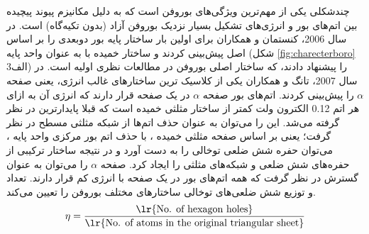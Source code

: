 چندشکلی یکی از مهم‌ترین ویژگی‌های بوروفن است که به دلیل مکانیزم پیوند پیچیده بین اتم‌های بور و انرژی‌های تشکیل بسیار نزدیک بوروفن آزاد (بدون تکیه‌گاه) است. در سال 2006، کنستمان و همکاران \cite{kunstmannBroadBoronSheets2006} برای اولین بار ساختار پایه بور دوبعدی را بر اساس اصل  پیش‌بینی کردند و ساختار خمیده با  به عنوان واحد پایه (شکل \ref{fig:charecterboro} 3الف) را پیشنهاد دادند، که ساختار اصلی بوروفن در مطالعات نظری اولیه است. در سال 2007، تانگ و همکاران \cite{tangSelfdopingBoronSheets2009, tangNovelPrecursorsBoron2007} یکی از کلاسیک‌ ترین ساختارهای غالب انرژی، یعنی صفحه $\alpha$ را پیش‌بینی کردند. اتم‌های بور صفحه $\alpha$ در یک صفحه قرار دارند که انرژی آن به ازای هر اتم 0.12 الکترون ولت کمتر از ساختار مثلثی خمیده است که قبلا پایدارترین در نظر گرفته می‌شد. این را می‌توان به عنوان حذف اتم‌ها از شبکه مثلثی مسطح در نظر گرفت؛ یعنی بر اساس صفحه مثلثی خمیده ، با حذف اتم بور مرکزی واحد پایه ، می‌توان حفره شش ضلعی توخالی را به دست آورد و در نتیجه ساختار ترکیبی از حفره‌های شش ضلعی و شبکه‌های مثلثی را ایجاد کرد. صفحه $\alpha$ را می‌توان به عنوان گسترش  در نظر گرفت که همه اتم‌های بور در یک صفحه با انرژی کم قرار دارند. تعداد و توزیع شش ضلعی‌های توخالی  ساختارهای مختلف بوروفن را تعیین می‌کند.
\begin{equation}
    \eta=\frac{\text{\lr{No. of hexagon holes}}}{\text{\lr{No. of atoms in the original triangular sheet}}}
\end{equation}

